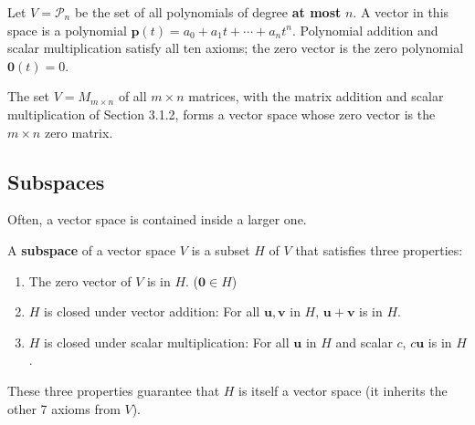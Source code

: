 \begin{example}
Let $V=\mathcal{P}_n$ be the set of all polynomials of degree \textbf{at most} $n$. A vector in this space is a polynomial $\mathbf{p}(t)=a_0+a_1t+\cdots+a_nt^n$.
Polynomial addition and scalar multiplication satisfy all ten axioms; the zero vector is the zero polynomial $\mathbf{0}(t)=0$.
\end{example}

\begin{example}
The set $V=M_{m\times n}$ of all $m\times n$ matrices, with the matrix addition and scalar multiplication of Section 3.1.2, forms a vector space whose zero vector is the $m\times n$ zero matrix.
\end{example}


\subsection{Subspaces}
Often, a vector space is contained inside a larger one.

\begin{definition}
A \textbf{subspace} of a vector space $V$ is a subset $H$ of $V$ that satisfies three properties:
\begin{enumerate}
    \item The zero vector of $V$ is in $H$. ($ \in H$)
    \item $H$ is closed under vector addition: For all $, $ in $H$, $ + $ is in $H$.
    \item $H$ is closed under scalar multiplication: For all $$ in $H$ and scalar $c$, $c$ is in $H$.
\end{enumerate}
These three properties guarantee that $H$ is itself a vector space (it inherits the other 7 axioms from $V$).
\end{definition}

